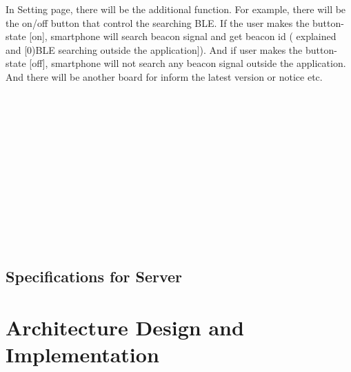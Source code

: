 \documentclass[conference]{IEEEtran}
\begin{document}
In Setting page, there will be the additional function. For example, there will be the on/off button that control the searching BLE. If the user makes the button-state [on], smartphone will search beacon signal and get beacon id ( explained and [0)BLE searching outside the application]). And if user makes the button-state [off], smartphone will not search any beacon signal outside the application. And there will be another board for inform the latest version or notice etc. \\\\\\\\\\\\\\\\\\\\\\\\\\
\subsection{Specifications for Server}


\section{Architecture Design and Implementation}
\end{document}
